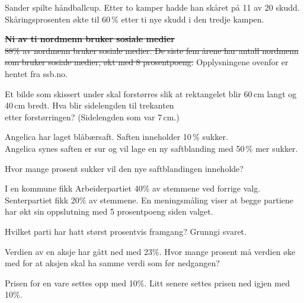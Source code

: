 \newpage

Sander spilte håndballcup. Etter to kamper hadde han skåret på 11 av 20 skudd.
Skåringsprosenten økte til 60\,\% etter ti nye skudd i den tredje kampen.

\st{
\textbf{Ni av ti nordmenn bruker sosiale medier} \\
88\% av nordmenn bruker sosiale medier.
De siste fem årene har antall nordmenn som bruker sosiale
medier, økt med 8 prosentpoeng.
}
Opplysningene ovenfor er hentet fra ssb.no.\os
{}

Et bilde som skissert under skal forstørres slik at rektangelet blir 60\,cm langt og 40\,cm bredt. Hva blir sidelengden til trekanten\\ etter forstørringen? (Sidelengden som var 7\,cm.)


Angelica har laget blåbærsaft. Saften inneholder 10\,\% sukker. \\ Angelica synes saften
er sur og vil lage en ny saftblanding med 50\,\% mer sukker. \os

Hvor mange prosent sukker vil den nye saftblandingen inneholde?

I en kommune fikk Arbeiderpartiet 40\% av stemmene ved forrige valg. Senterpartiet
fikk 20\% av stemmene. En meningsmåling viser at begge partiene har økt sin
oppslutning med 5 prosentpoeng siden valget. \os

Hvilket parti har hatt størst prosentvis framgang? Grunngi svaret.

Verdien av en aksje har gått ned med 23\%.
Hvor mange prosent må verdien øke med for at aksjen skal ha samme verdi som før
nedgangen?

Prisen for en vare settes opp med 10\%.
Litt senere settes prisen ned igjen med 10\%. \os

